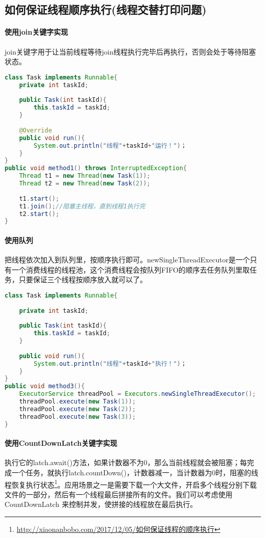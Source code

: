 \documentclass[../../../interview-questions.tex]{subfiles}
\begin{document}
\subsection{如何保证线程顺序执行(线程交替打印问题)}

\paragraph{使用join关键字实现}join关键字用于让当前线程等待join线程执行完毕后再执行，否则会处于等待阻塞状态。

\begin{lstlisting}[language=Java]
class Task implements Runnable{
    private int taskId;
    
    public Task(int taskId){
        this.taskId = taskId; 
    }    
    
    @Override
    public void run(){
        System.out.println("线程"+taskId+"运行！")；
    }
}
public void method1() throws InterruptedException{
    Thread t1 = new Thread(new Task(1));
    Thread t2 = new Thread(new Task(2));
    
    t1.start();
    t1.join();//阻塞主线程，直到线程1执行完
    t2.start();
}
\end{lstlisting}

\paragraph{使用队列}把线程依次加入到队列里，按顺序执行即可。newSingleThreadExecutor是一个只有一个消费线程的线程池，这个消费线程会按队列FIFO的顺序去任务队列里取任务，只要保证三个线程按顺序放入就可以了。

\begin{lstlisting}[language=Java]
class Task implements Runnable{
    
    private int taskId;
    
    public Task(int taskId){
        this.taskId = taskId;
    }
    
    public void run(){
        System.out.println("线程"+taskId+"执行！")；
    }
}
public void method3(){
    ExecutorService threadPool = Executors.newSingleThreadExecutor();
    threadPool.execute(new Task(1));
    threadPool.execute(new Task(2));
    threadPool.execute(new Task(3));
}
\end{lstlisting}

\paragraph{使用CountDownLatch关键字实现}执行它的latch.await()方法，如果计数器不为0，那么当前线程就会被阻塞；每完成一个任务，就执行latch.countDown()，计数器减一，当计数器为0时，阻塞的线程恢复执行状态\footnote{\url{http://xiaonanbobo.com/2017/12/05/如何保证线程的顺序执行}}。应用场景之一是需要下载一个大文件，开启多个线程分别下载文件的一部分，然后有一个线程最后拼接所有的文件。我们可以考虑使用 CountDownLatch 来控制并发，使拼接的线程放在最后执行。
\end{document}

